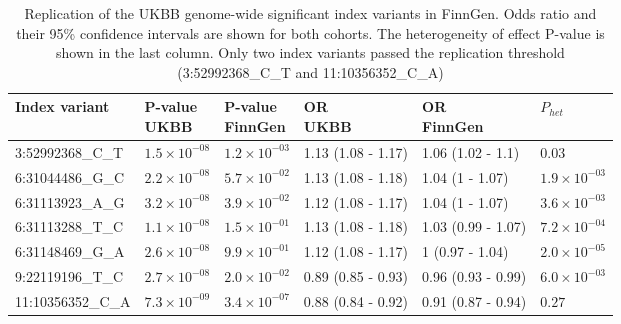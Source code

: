 


\begin{table}[H]
  \centering\begingroup\fontsize{10}{12}\selectfont
  
  \caption[Replication of the UKBB genome-wide significant index variants in FinnGen]{Replication of the UKBB genome-wide significant index variants in FinnGen. Odds ratio and their 95\% confidence intervals are shown for both cohorts. The heterogeneity of effect P-value is shown in the last column. Only two index variants passed the replication threshold (3:52992368\_C\_T  and 11:10356352\_C\_A)}
  \label{table:replication_ukbb_in_finngen}
  \begin{tabular}[t]{llllll}
  \toprule
  Index variant & \makecell{P-value\\ UKBB} & \makecell{P-value\\ FinnGen} & \makecell{OR\\ UKBB} & \makecell{OR\\ FinnGen} & $P_{het}$\\
  \midrule
  3:52992368\_C\_T & $1.5\times10^{-08}$ & $1.2\times10^{-03}$ & 1.13 (1.08 - 1.17) & 1.06 (1.02 - 1.1) & $0.03$\\
  6:31044486\_G\_C & $2.2\times10^{-08}$ & $5.7\times10^{-02}$ & 1.13 (1.08 - 1.18) & 1.04 (1 - 1.07) & $1.9\times10^{-03}$\\
  6:31113923\_A\_G & $3.2\times10^{-08}$ & $3.9\times10^{-02}$ & 1.12 (1.08 - 1.17) & 1.04 (1 - 1.07) & $3.6\times10^{-03}$\\
  6:31113288\_T\_C & $1.1\times10^{-08}$ & $1.5\times10^{-01}$ & 1.13 (1.08 - 1.18) & 1.03 (0.99 - 1.07) & $7.2\times10^{-04}$\\
  6:31148469\_G\_A & $2.6\times10^{-08}$ & $9.9\times10^{-01}$ & 1.12 (1.08 - 1.17) & 1 (0.97 - 1.04) & $2.0\times10^{-05}$\\
  9:22119196\_T\_C & $2.7\times10^{-08}$ & $2.0\times10^{-02}$ & 0.89 (0.85 - 0.93) & 0.96 (0.93 - 0.99) & $6.0\times10^{-03}$\\
  11:10356352\_C\_A & $7.3\times10^{-09}$ & $3.4\times10^{-07}$ & 0.88 (0.84 - 0.92) & 0.91 (0.87 - 0.94) & $0.27$\\
  \bottomrule
  \end{tabular}
  \endgroup{}
  \end{table}




